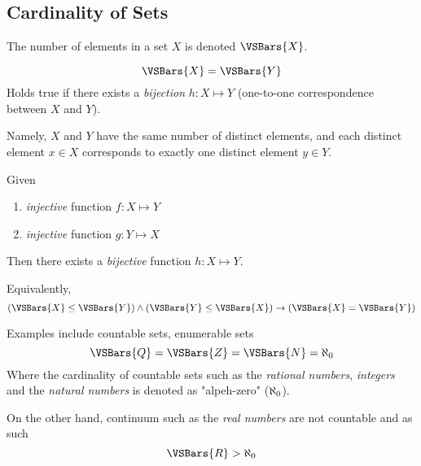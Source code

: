 \subsection{Cardinality of Sets}
\begin{definition}[Cardinality]
    The number of elements in a set $X$ is denoted $\VSBars{X}$.
\end{definition}

\begin{definition}
    \begin{equation}
        \VSBars{X} = \VSBars{Y}
    \end{equation}
    Holds true if there exists a \textit{bijection} $h \colon X \mapsto Y$ (one-to-one correspondence between $X$ and $Y$).
    
    Namely, $X$ and $Y$ have the same number of distinct elements, and each distinct element $x \in X$ corresponds to exactly one distinct element $y \in Y$.
\end{definition}

\begin{theorem}
    Given
    \begin{enumerate}
        \item \textit{injective} function $f \colon X \mapsto Y$
        \item \textit{injective} function $g \colon Y \mapsto X$
    \end{enumerate}
    Then there exists a \textit{bijective} function $h \colon X \mapsto Y$.
    
    Equivalently,
    \begin{equation}
        (\VSBars{X} \le \VSBars{Y}) \land (\VSBars{Y} \le \VSBars{X}) \to (\VSBars{X} = \VSBars{Y})
    \end{equation}
\end{theorem}

\begin{remark}
    Examples include countable sets, enumerable sets
    \begin{equation}
        \VSBars{\Rational} = \VSBars{\Int} = \VSBars{\NatNum} = \AlephZero
    \end{equation}
    Where the cardinality of countable sets such as the \textit{rational numbers}, \textit{integers} and the \textit{natural numbers} is denoted as "alpeh-zero" ($\aleph_{0}$).
    
    On the other hand, continuum such as the \textit{real numbers} are not countable and as such
    \begin{equation}
        \VSBars{\Real} > \AlephZero
    \end{equation}
\end{remark}


